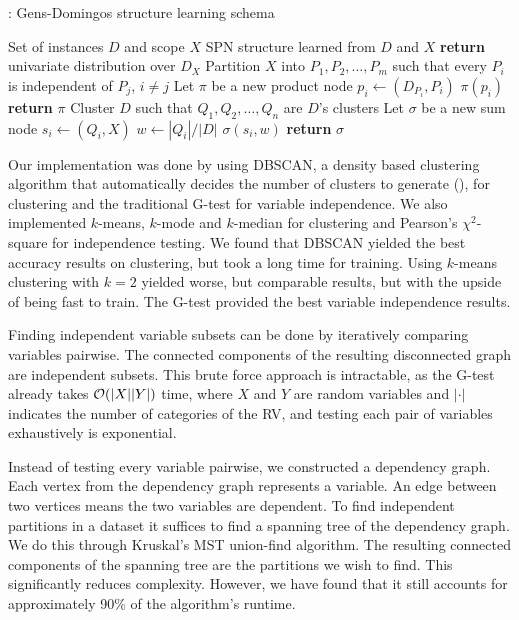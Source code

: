 \begin{algorithm}[H]
  \caption{: Gens-Domingos structure learning schema}
  \begin{algorithmic}[1]
    \Require Set of instances $D$ and scope $X$
    \Ensure SPN structure learned from $D$ and $X$
      \State \textbf{return} univariate distribution over $D_X$
    \Else%
      \State Partition $X$ into $P_1,P_2,\ldots,P_m$ such that every $P_i$ is independent of $P_j$,
        $i\neq j$
        \State Let $\pi$ be a new product node
          \State $p_i\gets$$(D_{P_i}, P_i)$
          \State $\pi$$(p_i)$
        \EndFor%
        \State \textbf{return} $\pi$
      \Else%
        \State Cluster $D$ such that $Q_1,Q_2,\ldots,Q_n$ are $D$'s clusters
        \State Let $\sigma$ be a new sum node
          \State $s_i\gets$$(Q_i, X)$
          \State $w\gets |Q_i|/|D|$
          \State $\sigma$$(s_i, w)$ 
        \EndFor%
        \State \textbf{return} $\sigma$
      \EndIf%
    \EndIf%
  \end{algorithmic}
\end{algorithm}

Our implementation was done by using DBSCAN, a density based clustering algorithm that
automatically decides the number of clusters to generate (\cite{dbscan}), for clustering and the
traditional G-test for variable independence. We also implemented $k$-means, $k$-mode and
$k$-median for clustering and Pearson's $\chi^2$-square for independence testing. We found that
DBSCAN yielded the best accuracy results on clustering, but took a long time for training. Using
$k$-means clustering with $k=2$ yielded worse, but comparable results, but with the upside of being
fast to train. The G-test provided the best variable independence results.

Finding independent variable subsets can be done by iteratively comparing variables pairwise. The
connected components of the resulting disconnected graph are independent subsets. This brute force
approach is intractable, as the G-test already takes $\mathcal{O}(|X||Y|)$ time, where $X$ and $Y$ are
random variables and $|\cdot|$ indicates the number of categories of the RV, and testing each pair
of variables exhaustively is exponential.

Instead of testing every variable pairwise, we constructed a dependency graph. Each vertex from the
dependency graph represents a variable. An edge between two vertices means the two variables are
dependent. To find independent partitions in a dataset it suffices to find a spanning tree of the
dependency graph. We do this through Kruskal's MST union-find algorithm. The resulting connected
components of the spanning tree are the partitions we wish to find. This significantly reduces
complexity. However, we have found that it still accounts for approximately 90\% of the algorithm's
runtime.

